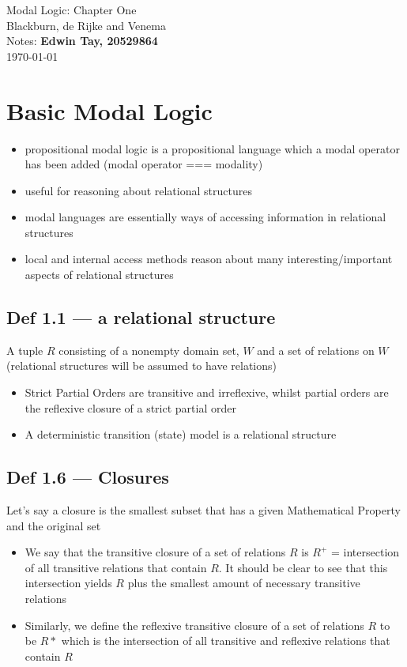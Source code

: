 \documentclass[10pt, a4paper, twoside]{article}
\begin{document}
\begin{titlepage}
\begin{center}
\vspace*{10cm}
\Huge{Modal Logic: Chapter One} \\[1cm]
\LARGE{Blackburn, de Rijke and Venema} \\[1cm]
\large{Notes: {\bf Edwin Tay, 20529864}}\\[1cm]
\today
\end{center}
\end{titlepage}
\pagebreak

\section{Basic Modal Logic}
\begin{itemize}
  \item propositional modal logic is a propositional language which a modal operator has been added (modal operator === modality)
  \item useful for reasoning about relational structures
  \item modal languages are essentially ways of accessing information in relational structures
  \item local and internal access methods reason about many interesting/important aspects of relational structures
\end{itemize}
\subsection{Def 1.1 --- a relational structure}
A tuple $R$ consisting of a nonempty domain set, $W$ and a set of relations on $W$ (relational structures will be assumed to have relations)

\begin{itemize}
  \item Strict Partial Orders are transitive and irreflexive, whilst partial orders are the reflexive closure of a strict partial order
  \item A deterministic transition (state) model is a relational structure
\end{itemize}

\subsection{Def 1.6 --- Closures}
Let's say a closure is the smallest subset that has a given Mathematical Property and the original set
\begin{itemize}
  \item We say that the transitive closure of a set of relations $R$ is $R^+$ =   intersection of all transitive relations that contain $R$. It should be clear to see that this intersection yields $R$ plus the smallest amount of necessary transitive relations
  \item Similarly, we define the reflexive transitive closure of a set of relations $R$ to be $R*$ which is the intersection of all transitive and reflexive relations that contain $R$
\end{itemize}
\end{document}

